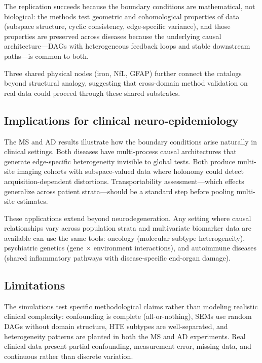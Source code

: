 \documentclass{article}
\begin{document}
The replication succeeds because the boundary conditions are mathematical, not biological: the methods test geometric and cohomological properties of data (subspace structure, cyclic consistency, edge-specific variance), and those properties are preserved across diseases because the underlying causal architecture---DAGs with heterogeneous feedback loops and stable downstream paths---is common to both.

Three shared physical nodes (iron, NfL, GFAP) further connect the catalogs beyond structural analogy, suggesting that cross-domain method validation on real data could proceed through these shared substrates.

\subsection{Implications for clinical neuro-epidemiology}

The MS and AD results illustrate how the boundary conditions arise naturally in clinical settings.
Both diseases have multi-process causal architectures that generate edge-specific heterogeneity invisible to global tests.
Both produce multi-site imaging cohorts with subspace-valued data where holonomy could detect acquisition-dependent distortions.
Transportability assessment---which effects generalize across patient strata---should be a standard step before pooling multi-site estimates.

These applications extend beyond neurodegeneration.
Any setting where causal relationships vary across population strata and multivariate biomarker data are available can use the same tools: oncology (molecular subtype heterogeneity), psychiatric genetics (gene $\times$ environment interactions), and autoimmune diseases (shared inflammatory pathways with disease-specific end-organ damage).

\subsection{Limitations}

The simulations test specific methodological claims rather than modeling realistic clinical complexity: confounding is complete (all-or-nothing), SEMs use random DAGs without domain structure, HTE subtypes are well-separated, and heterogeneity patterns are planted in both the MS and AD experiments.
Real clinical data present partial confounding, measurement error, missing data, and continuous rather than discrete variation.
\end{document}
